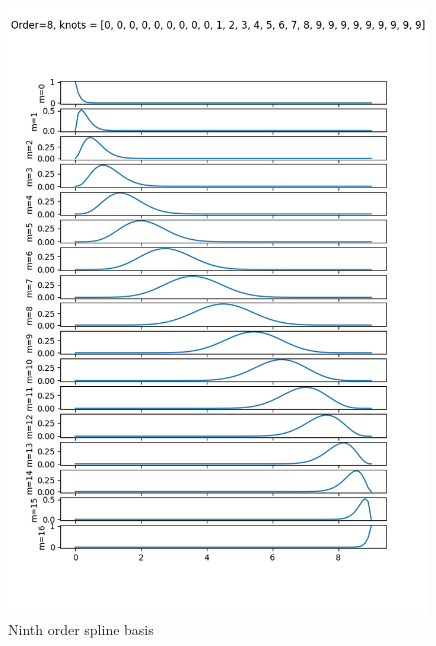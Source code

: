 \begin{figure}[hbt]
  \centering\includegraphics[width=0.99\textwidth]{./chap5_trajectory_planning/figures/spline_basis_8}
  \caption{Ninth order spline basis}
  \label{fig:spline_basis_8}  
\end{figure}

\clearpage

\par{}

